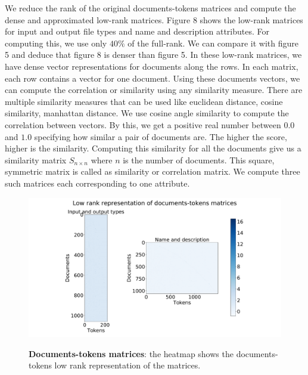 We reduce the rank of the original documents-tokens matrices and compute the dense and approximated low-rank matrices. Figure 8 shows the low-rank matrices for input and output file types and name and description attributes. For computing this, we use only $40\%$ of the full-rank. We can compare it with figure 5 and deduce that figure 8 is denser than figure 5. In these low-rank matrices, we have dense vector representations for documents along the rows. In each matrix, each row contains a vector for one document. Using these documents vectors, we can compute the correlation or similarity using any similarity measure. There are multiple similarity measures that can be used like euclidean distance, cosine similarity, manhattan distance. We use cosine angle similarity to compute the correlation between vectors. By this, we get a positive real number between $0.0$ and $1.0$ specifying how similar a pair of documents are. The higher the score, higher is the similarity. Computing this similarity for all the documents give us a similarity matrix $S_{n \times n}$ where $n$ is the number of documents. This square, symmetric matrix is called as similarity or correlation matrix. We compute three such matrices each corresponding to one attribute.
  
\begin{figure}[h]
\begin{centering}
    {\includegraphics[scale=0.33]{figures/Document_tokens_low_rank.pdf}}
    \caption[Documents-tokens matrices]{\textbf{Documents-tokens matrices}: the heatmap shows the documents-tokens low rank representation of the matrices.}
\end{centering}
\end{figure}

